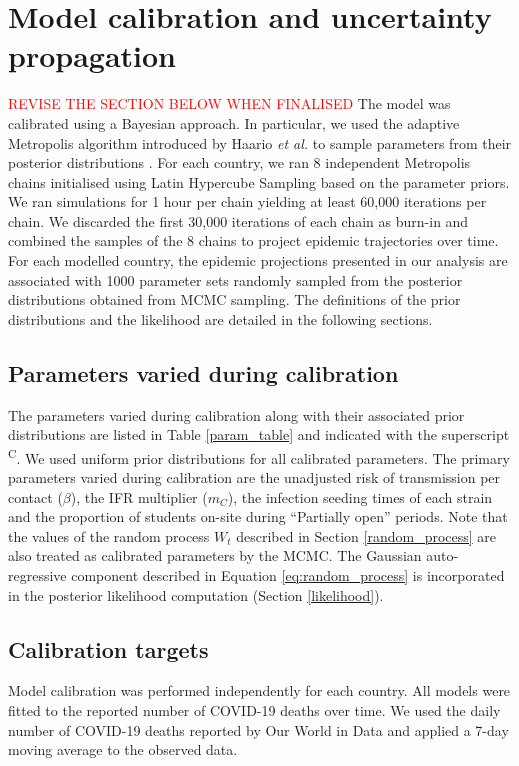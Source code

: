 \section{Model calibration and uncertainty propagation}
\label{calibration}
\textcolor{red}{REVISE THE SECTION BELOW WHEN FINALISED}
The model was calibrated using a Bayesian approach. In particular, we used the adaptive 
Metropolis algorithm introduced by Haario \textit{et al.} to sample parameters from their 
posterior distributions \cite{haario-2001}. For each country, we ran 8 independent Metropolis 
chains initialised using Latin Hypercube Sampling based on the parameter priors. 
We ran simulations for 1 hour per chain yielding at least 60,000 iterations per 
chain. We discarded the first 30,000 iterations of each chain as burn-in and combined the 
samples of the 8 chains to project epidemic trajectories over time. 
For each modelled country, the epidemic projections presented in our analysis are associated with 1000 parameter sets 
randomly sampled from the posterior distributions obtained from MCMC sampling. 
The definitions of the prior distributions and the likelihood are detailed in the following sections.

\subsection{Parameters varied during calibration}

The parameters varied during calibration along with their associated prior distributions 
are listed in Table \ref{param_table} and indicated with the superscript \textsuperscript{C}.
We used uniform prior distributions for all calibrated parameters. The primary parameters varied during calibration are 
the unadjusted risk of transmission per contact ($\beta$), the IFR multiplier ($m_C$), the infection seeding times of 
each strain and the proportion of students on-site during ``Partially open'' periods. Note that the values of the random 
process $W_t$ described in Section \ref{random_process} are also treated as calibrated parameters by the MCMC. The Gaussian 
auto-regressive component described in Equation \ref{eq:random_process} is incorporated in the posterior likelihood 
computation (Section \ref{likelihood}).

\subsection{Calibration targets}
\label{targets}
Model calibration was performed independently for each country. All models were fitted to the reported number of COVID-19 deaths over time.
We used the daily number of COVID-19 deaths reported by Our World in Data and applied a 7-day moving average to the observed data. 

